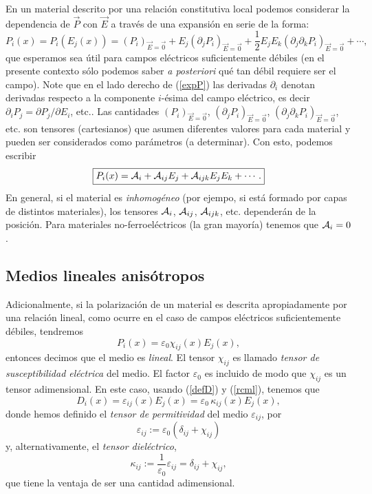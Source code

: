 En un material descrito por una relación constitutiva local podemos considerar
la dependencia de $\vec{P}$ con $\vec{E}$ a través de una expansión en serie
de la forma:
\begin{equation}\label{expP}
P_i(x)=P_i(E_j(x))=(P_i)_{\vec{E}=\vec{0}}
+E_j(\partial_jP_i)_{\vec{E}=\vec{0}}+\frac{1}{2}
E_jE_k(\partial_j\partial_k P_i)_{\vec{E}=\vec{0}}+\cdots,
\end{equation}
que esperamos sea útil para campos eléctricos suficientemente débiles (en el
presente contexto sólo podemos saber \textit{a posteriori} qué tan débil
requiere ser el campo). Note que en el lado derecho de (\ref{expP}) las derivadas $\partial_i$ denotan derivadas respecto a la componente $i$-ésima del campo eléctrico, es decir $\partial_iP_j={\partial P_j}/{\partial E_i}$, etc.. Las cantidades $(P_i)_{\vec{E}=\vec{0}}$,
$(\partial_jP_i)_{\vec{E}=\vec{0}}$,
$(\partial_j\partial_k P_i)_{\vec{E}=\vec{0}}$, etc. son
tensores (cartesianos) que asumen diferentes valores para cada material y pueden ser
considerados como parámetros (a determinar). Con esto, podemos escribir
\begin{equation}
\boxed{P_i(x)={\cal A}_i+{\cal A}_{ij}E_j+{\cal A}_{ijk}
E_jE_k+\cdots.}
\end{equation}
En general, si el material es \textit{inhomogéneo} (por ejempo, si está formado por
capas de distintos materiales), los tensores ${\cal A}_i$, ${\cal A}_{ij}$, ${\cal A}_{ijk}$, etc. dependerán de la posición. Para materiales no-ferroeléctricos (la gran mayoría) tenemos que ${\cal A}_i=0$.



\subsection{Medios lineales anisótropos}\label{sec:aniso}

Adicionalmente, si la polarización de un material es descrita apropiadamente
por una relación lineal, como ocurre en el caso de campos eléctricos
suficientemente débiles, tendremos
\begin{equation}
\boxed{P_i(x)=\varepsilon_0\chi_{ij}(x)E_j(x),} \label{rcml}
\end{equation}
entonces decimos que el medio es \textit{lineal}. El tensor $\chi_{ij}$ es
llamado \textit{tensor de susceptibilidad eléctrica} del medio.  El factor $\varepsilon_0$ es incluido de modo que $\chi_{ij}$ es un tensor adimensional. En este caso,
usando (\ref{defD}) y (\ref{rcml}), tenemos que
\begin{equation}\label{rclai}
\boxed{D_i(x)=\varepsilon_{ij}(x)E_j(x)=\varepsilon_0\,\kappa_{ij}(x)E_j(x),}
\end{equation}
donde hemos definido el \textit{tensor de permitividad} del medio
$\varepsilon_{ij}$, por
\begin{equation}
\varepsilon_{ij}:=\varepsilon_0(\delta_{ij}+\chi_{ij})
\end{equation}
y, alternativamente,  el \textit{tensor dieléctrico},
\begin{equation}
\kappa_{ij}:=\frac{1}{\varepsilon_0}\varepsilon_{ij}=\delta_{ij}+\chi_{ij},
\end{equation}
que tiene la ventaja de ser una cantidad adimensional.

